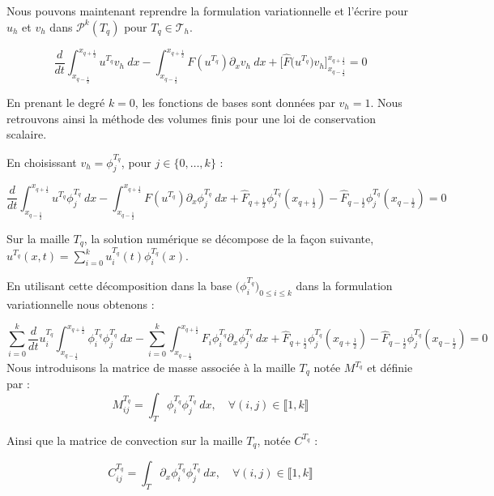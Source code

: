 Nous pouvons maintenant reprendre la formulation variationnelle et l'écrire pour $u_h$ et $v_h$ dans $\mathcal{P}^k(T_q)$ pour $T_q \in \mathcal{T}_h$.

$$\frac{d}{dt}\int_{x_{q-\frac{1}{2}}}^{x_{q+\frac{1}{2}}} u^{T_q}v_h \ dx - \int_{x_{q-\frac{1}{2}}}^{x_{q+\frac{1}{2}}} F(u^{T_q})\partial_xv_h \ dx + \Big[ \widehat{F}\big(u^{T_q}\big)v_h \Big]_{x_{q-\frac{1}{2}}}^{x_{q+\frac{1}{2}}} = 0 $$

\begin{remarkbox}
\begin{remark}
    En prenant le degré $k = 0$, les fonctions de bases sont données par $v_h = 1$. Nous retrouvons ainsi la méthode des volumes finis pour une loi de conservation scalaire.
\end{remark}
\end{remarkbox}

\vspace{1em}

En choisissant $v_h = \phi_j^{T_q}$, pour $j \in \{0,\dots,k\}$ :

$$\frac{d}{dt}\int_{x_{q-\frac{1}{2}}}^{x_{q+\frac{1}{2}}} u^{T_q}\phi_j^{T_q} \ dx - \int_{x_{q-\frac{1}{2}}}^{x_{q+\frac{1}{2}}} F(u^{T_q})\partial_x\phi_j^{T_q} \ dx + \widehat{F}_{q+\frac{1}{2}}\phi_j^{T_q}(x_{q+\frac{1}{2}}) - \widehat{F}_{q-\frac{1}{2}}\phi_j^{T_q}(x_{q-\frac{1}{2}}) = 0 $$

Sur la maille $T_q$, la solution numérique se décompose de la façon suivante, $u^{T_q}(x,t) = \sum_{i=0}^{k} u_i^{T_q}(t)\phi_i^{T_q}(x)$.

En utilisant cette décomposition dans la base $\Big(\phi_i^{T_q}\Big)_{0\leq i \leq k}$ dans la formulation variationnelle nous obtenons :

$$\sum_{i=0}^{k} \frac{d}{dt}  u_i^{T_q} \int_{x_{q-\frac{1}{2}}}^{x_{q+\frac{1}{2}}} \phi_i^{T_q} \phi_j^{T_q} \ dx - \sum_{i=0}^{k} \int_{x_{q-\frac{1}{2}}}^{x_{q+\frac{1}{2}}} F_i\phi_i^{T_q}\partial_x\phi_j^{T_q} \ dx + \widehat{F}_{q+\frac{1}{2}}\phi_j^{T_q}(x_{q+\frac{1}{2}}) - \widehat{F}_{q-\frac{1}{2}}\phi_j^{T_q}(x_{q-\frac{1}{2}}) = 0$$
Nous introduisons la matrice de masse associée à la maille $T_q$ notée $M^{T_q}$ et définie par :
$$M^{T_q}_{ij} = \int_T \phi_i^{T_q} \phi_j^{T_q} \ dx, \quad \forall (i,j) \in \llbracket 1, k \rrbracket$$

Ainsi que la matrice de convection sur la maille $T_q$, notée $C^{T_q}$ :

$$C^{T_q}_{ij} = \int_T \partial_x \phi_i^{T_q} \phi_j^{T_q} \ dx, \quad \forall (i,j) \in \llbracket 1, k \rrbracket $$

